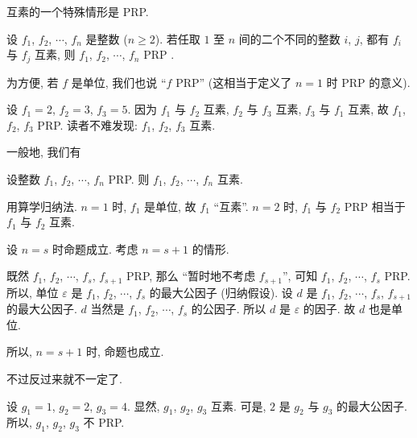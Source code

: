 互素的一个特殊情形是 PRP.

\begin{definition}
    设 $f_1$, $f_2$, $\cdots$, $f_n$ 是整数 ($n \geq 2$). 若任取 $1$ 至 $n$ 间的二个不同的整数 $i$, $j$, 都有 $f_i$ 与 $f_j$ 互素, 则 $f_1$, $f_2$, $\cdots$, $f_n$ PRP .

    为方便, 若 $f$ 是单位, 我们也说 ``$f$ PRP'' (这相当于定义了 $n = 1$ 时 PRP 的意义).
\end{definition}

\begin{example}
    设 $f_1 = 2$, $f_2 = 3$, $f_3 = 5$. 因为 $f_1$ 与 $f_2$ 互素, $f_2$ 与 $f_3$ 互素, $f_3$ 与 $f_1$ 互素, 故 $f_1$, $f_2$, $f_3$ PRP. 读者不难发现: $f_1$, $f_2$, $f_3$ 互素.
\end{example}

一般地, 我们有
\begin{proposition}
    设整数 $f_1$, $f_2$, $\cdots$, $f_n$ PRP. 则 $f_1$, $f_2$, $\cdots$, $f_n$ 互素.
\end{proposition}

\begin{pf}
    用算学归纳法. $n = 1$ 时, $f_1$ 是单位, 故 $f_1$ ``互素''. $n = 2$ 时, $f_1$ 与 $f_2$ PRP 相当于 $f_1$ 与 $f_2$ 互素.

    设 $n = s$ 时命题成立. 考虑 $n = s + 1$ 的情形.

    既然 $f_1$, $f_2$, $\cdots$, $f_s$, $f_{s+1}$ PRP, 那么 ``暂时地不考虑 $f_{s+1}$'', 可知 $f_1$, $f_2$, $\cdots$, $f_s$ PRP. 所以, 单位 $\varepsilon$ 是 $f_1$, $f_2$, $\cdots$, $f_s$ 的最大公因子 (归纳假设). 设 $d$ 是 $f_1$, $f_2$, $\cdots$, $f_s$, $f_{s+1}$ 的最大公因子. $d$ 当然是 $f_1$, $f_2$, $\cdots$, $f_s$ 的公因子. 所以 $d$ 是 $\varepsilon$ 的因子. 故 $d$ 也是单位.

    所以, $n = s + 1$ 时, 命题也成立.
\end{pf}

不过反过来就不一定了.

\begin{example}
    设 $g_1 = 1$, $g_2 = 2$, $g_3 = 4$. 显然, $g_1$, $g_2$, $g_3$ 互素. 可是, $2$ 是 $g_2$ 与 $g_3$ 的最大公因子. 所以, $g_1$, $g_2$, $g_3$ 不 PRP.
\end{example}

